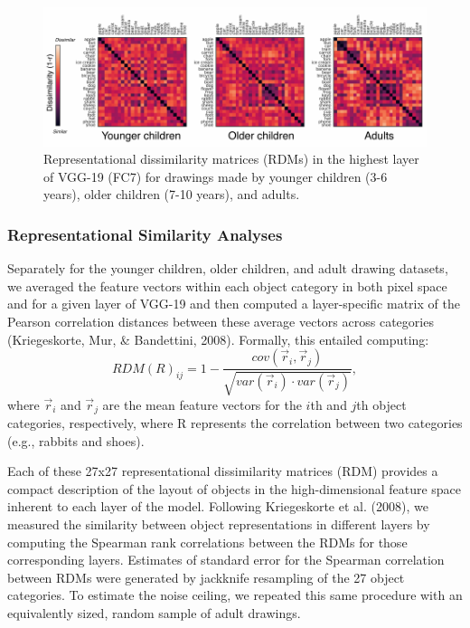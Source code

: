 \documentclass[10pt, letterpaper]{article}
\newenvironment{CodeChunk}{}{}
\begin{document}
\begin{CodeChunk}
\begin{figure}[h]

{\centering \includegraphics[width=1\linewidth]{figs/RSAAllCat-1} 

}

\caption[Representational dissimilarity matrices (RDMs) in the highest layer of VGG-19 (FC7) for drawings made by younger children (3-6 years), older children (7-10 years), and adults]{Representational dissimilarity matrices (RDMs) in the highest layer of VGG-19 (FC7) for drawings made by younger children (3-6 years), older children (7-10 years), and adults.}\label{fig:RSAAllCat}
\end{figure}
\end{CodeChunk}

\subsubsection{Representational Similarity
Analyses}\label{representational-similarity-analyses}

Separately for the younger children, older children, and adult drawing
datasets, we averaged the feature vectors within each object category in
both pixel space and for a given layer of VGG-19 and then computed a
layer-specific matrix of the Pearson correlation distances between these
average vectors across categories (Kriegeskorte, Mur, \& Bandettini,
2008). Formally, this entailed computing:
\[RDM(R)_{ij} = 1- \frac{cov(\vec{r}_{i}, \vec{r}_{j})}{\sqrt{var(\vec{r}_{i}) \cdot var(\vec{r}_{j})}},\]
where \(\vec{r}_{i}\) and \(\vec{r}_{j}\) are the mean feature vectors
for the \(i\)th and \(j\)th object categories, respectively, where R
represents the correlation between two categories (e.g., rabbits and
shoes).

Each of these 27x27 representational dissimilarity matrices (RDM)
provides a compact description of the layout of objects in the
high-dimensional feature space inherent to each layer of the model.
Following Kriegeskorte et al. (2008), we measured the similarity between
object representations in different layers by computing the Spearman
rank correlations between the RDMs for those corresponding layers.
Estimates of standard error for the Spearman correlation between RDMs
were generated by jackknife resampling of the 27 object categories. To
estimate the noise ceiling, we repeated this same procedure with an
equivalently sized, random sample of adult drawings.
\end{document}
